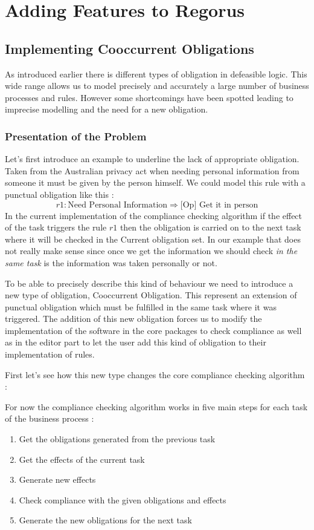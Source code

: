 \documentclass[10pt]{report}
\begin{document}
\newpage
\section{Adding Features to Regorus}
\subsection{Implementing Cooccurrent Obligations}
As introduced earlier there is different types of obligation in defeasible logic. This wide range allows us to model precisely and accurately a large number of business processes and rules. However some shortcomings have been spotted leading to imprecise modelling and the need for a new obligation.

\subsubsection{Presentation of the Problem}
Let's first introduce an example to underline the lack of appropriate obligation. Taken from the Australian privacy act when needing personal information from someone it must be given by the person himself. We could model this rule with a punctual obligation like this :
\begin{equation}
r1 : \text{Need Personal Information} \Rightarrow \text{[Op] Get it in person}
\end{equation}
In the current implementation of the compliance checking algorithm if the effect of the task triggers the rule $r1$ then the obligation is carried on to the next task where it will be checked in the Current obligation set. In our example that does not really make sense since once we get the information we should check \emph{in the same task} is the information was taken personally or not.

To be able to precisely describe this kind of behaviour we need to introduce a new type of obligation, Cooccurrent Obligation. This represent an extension of punctual obligation which must be fulfilled in the same task where it was triggered. The addition of this new obligation forces us to modify the implementation of the software in the core packages to check compliance as well as in the editor part to let the user add this kind of obligation to their implementation of rules.

First let's see how this new type changes the core compliance checking algorithm :

For now the compliance checking algorithm works in five main steps for each task of the business process :
\begin{enumerate}
\item Get the obligations generated from the previous task
\item Get the effects of the current task
\item Generate new effects
\item Check compliance with the given obligations and effects
\item Generate the new obligations for the next task
\end{enumerate}
\end{document}
